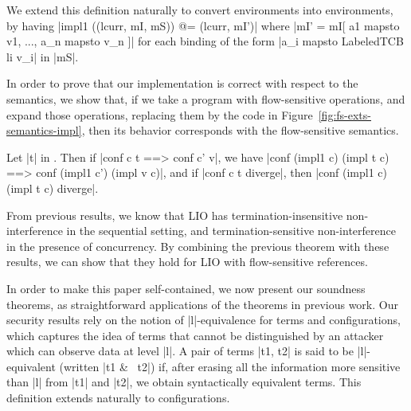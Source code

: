 We extend this definition naturally to convert \liofs{} environments into
\lio{} environments, by having |impl1 ((lcurr, mI, mS)) @= (lcurr, mI')|
where |mI' = mI[ a1 mapsto v1, ..., a_n mapsto v_n ]| for each binding
of the form |a_i mapsto LabeledTCB li v_i| in |mS|.

In order to prove that our implementation is correct with respect to
the semantics, we show that, if we take a program with flow-sensitive
operations, and expand those operations, replacing them by the code in
Figure~\ref{fig:fs-exts-semantics-impl}, then its behavior corresponds
with the flow-sensitive semantics.




\begin{theorem}\label{thm:eq} Let |t| in \liofs{}.
  Then if |conf c t ==> conf c' v|, we have |conf (impl1 c) (impl t c)
  ==> conf (impl1 c') (impl v c)|, and if |conf c t diverge|, then
  |conf (impl1 c) (impl t c) diverge|.
\end{theorem}

From previous results, we know that LIO has termination-insensitive
non-interference in the sequential setting, and termination-sensitive
non-interference in the presence of concurrency. By combining the previous
theorem with these results, we can show that they hold for LIO with
flow-sensitive references.

In order to make this paper self-contained, we now present our
soundness theorems, as straightforward applications of the theorems in
previous work. Our security results rely on the notion of
|l|-equivalence for terms and configurations, which captures the idea
of terms that cannot be distinguished by an attacker which can observe
data at level |l|. A pair of terms |t1, t2| is said to be
|l|-equivalent (written |t1 &~ t2|) if, after erasing all the
information more sensitive than |l| from |t1| and |t2|, we obtain
syntactically equivalent terms. This definition extends naturally to
configurations.

